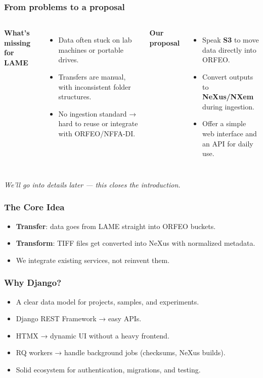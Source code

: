 \documentclass{beamer}
\begin{document}
	\begin{frame}
		\frametitle{From problems to a proposal}
		
		\begin{columns}[T,totalwidth=\textwidth]
			\textbf{What’s missing for LAME}
			\begin{itemize}
				\item Data often stuck on lab machines or portable drives.
				\item Transfers are manual, with inconsistent folder structures.
				\item No ingestion standard → hard to reuse or integrate with ORFEO/NFFA-DI.
			\end{itemize}
			
			\textbf{Our proposal}
			\begin{itemize}
				\item Speak \textbf{S3} to move data directly into ORFEO.
				\item Convert outputs to \textbf{NeXus/NXem} during ingestion.
				\item Offer a simple web interface and an API for daily use.
			\end{itemize}
		\end{columns}
		
		\vspace{0.5em}
		\small\textit{We’ll go into details later — this closes the introduction.}
	\end{frame}
	
	
	\begin{frame}
		\frametitle{The Core Idea}
		\begin{itemize}
			\item \textbf{Transfer}: data goes from LAME straight into ORFEO buckets.
			\item \textbf{Transform}: TIFF files get converted into NeXus with normalized metadata.
			\item We integrate existing services, not reinvent them.
		\end{itemize}
	\end{frame}
	
	\begin{frame}
		\frametitle{Why Django?}
		\begin{itemize}
			\item A clear data model for projects, samples, and experiments.
			\item Django REST Framework → easy APIs.
			\item HTMX → dynamic UI without a heavy frontend.
			\item RQ workers → handle background jobs (checksums, NeXus builds).
			\item Solid ecosystem for authentication, migrations, and testing.
		\end{itemize}
	\end{frame}
	
\end{document}
